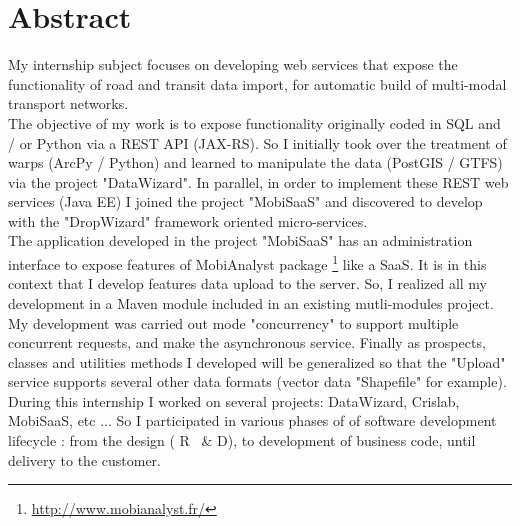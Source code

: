 \chapter*{Abstract}


My internship subject focuses on developing web services that expose the functionality of road and transit data import, for automatic build of multi-modal transport networks. \\

The objective of my work is to expose functionality originally coded in SQL and / or Python via a REST API (JAX-RS). So I initially took over the treatment of warps (ArcPy / Python) and learned to manipulate the data (PostGIS / GTFS) via the project "DataWizard". In parallel, in order to implement these REST web services (Java EE) I joined the project "MobiSaaS" and discovered to develop with the "DropWizard" framework oriented micro-services. \\

The application developed in the project "MobiSaaS" has an administration interface to expose features of MobiAnalyst package \footnote{\url{http://www.mobianalyst.fr/}} like a SaaS. It is in this context that I develop features data upload to the server. So, I realized all my development in a Maven module included in an existing mutli-modules project. My development was carried out mode "concurrency" to support multiple concurrent requests, and make the asynchronous service. Finally as prospects, classes and utilities methods I developed will be generalized so that the "Upload" service supports several other data formats (vector data "Shapefile" for example). \\

During this internship I worked on several projects: DataWizard, Crislab, MobiSaaS, etc ... So I participated in various phases of of software development lifecycle : from the design ( R \ & D), to development of business code, until delivery to the customer. \\

